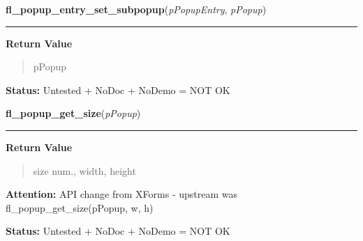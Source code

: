     \label{xformslib:flpopup:fl_popup_entry_set_subpopup}

    \vspace{0.5ex}

\hspace{.8\funcindent}\begin{boxedminipage}{\funcwidth}

    \raggedright \textbf{fl\_popup\_entry\_set\_subpopup}(\textit{pPopupEntry}, \textit{pPopup})

    \vspace{-1.5ex}

    \rule{\textwidth}{0.5\fboxrule}
\setlength{\parskip}{2ex}
\setlength{\parskip}{1ex}
      \textbf{Return Value}
    \vspace{-1ex}

      \begin{quote}
      pPopup

      \end{quote}

\textbf{Status:} Untested + NoDoc + NoDemo = NOT OK



    \end{boxedminipage}

    \label{xformslib:flpopup:fl_popup_get_size}

    \vspace{0.5ex}

\hspace{.8\funcindent}\begin{boxedminipage}{\funcwidth}

    \raggedright \textbf{fl\_popup\_get\_size}(\textit{pPopup})

    \vspace{-1.5ex}

    \rule{\textwidth}{0.5\fboxrule}
\setlength{\parskip}{2ex}
\setlength{\parskip}{1ex}
      \textbf{Return Value}
    \vspace{-1ex}

      \begin{quote}
      size num., width, height

      \end{quote}

\textbf{Attention:} API change from XForms - upstream was fl\_popup\_get\_size(pPopup, w, h)



\textbf{Status:} Untested + NoDoc + NoDemo = NOT OK



    \end{boxedminipage}

